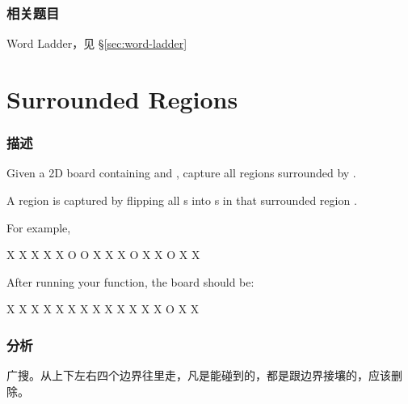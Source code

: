\subsubsection{相关题目}

\begindot
\item Word Ladder，见 \S \ref{sec:word-ladder}
\myenddot


\section{Surrounded Regions} %
\label{sec:surrounded-regions}


\subsubsection{描述}
Given a 2D board containing  and , capture all regions surrounded by .

A region is captured by flipping all s into s in that surrounded region .

For example,
\begin{Code}
X X X X
X O O X
X X O X
X O X X
\end{Code}

After running your function, the board should be:
\begin{Code}
X X X X
X X X X
X X X X
X O X X
\end{Code}


\subsubsection{分析}
广搜。从上下左右四个边界往里走，凡是能碰到的，都是跟边界接壤的，应该删除。


